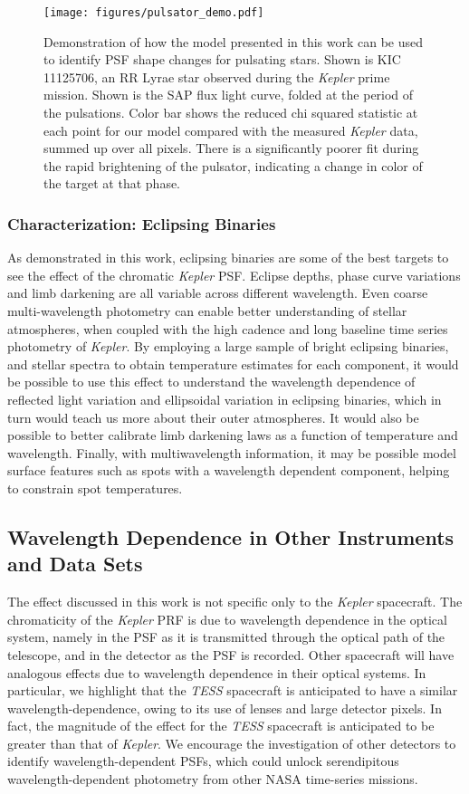 \documentclass[iop]{emulateapj}
\newcommand{\kepler}{\emph{Kepler}\xspace}
\newcommand{\tess}{\emph{TESS}\xspace}
\begin{document}
\begin{figure}
    \centering
    \texttt{[image: figures/pulsator\_demo.pdf]}
    \caption{Demonstration of how the model presented in this work can be used to identify PSF shape changes for pulsating stars. Shown is KIC 11125706, an RR Lyrae star observed during the \kepler prime mission. Shown is the SAP flux light curve, folded at the period of the pulsations. Color bar shows the reduced chi squared statistic at each point for our model compared with the measured \kepler data, summed up over all pixels. There is a significantly poorer fit during the rapid brightening of the pulsator, indicating a change in color of the target at that phase.}
    \label{fig:pulsator_demos}
\end{figure}



\subsubsection{Characterization: Eclipsing Binaries}
As demonstrated in this work, eclipsing binaries are some of the best targets to see the effect of the chromatic \kepler PSF. Eclipse depths, phase curve variations and limb darkening are all variable across different wavelength. Even coarse multi-wavelength photometry can enable better understanding of stellar atmospheres, when coupled with the high cadence and long baseline time series photometry of \kepler. By employing a large sample of bright eclipsing binaries, and stellar spectra to obtain temperature estimates for each component, it would be possible to use this effect to understand the wavelength dependence of reflected light variation and ellipsoidal variation in eclipsing binaries, which in turn would teach us more about their outer atmospheres. It would also be possible to better calibrate limb darkening laws as a function of temperature and wavelength. Finally, with multiwavelength information, it may be possible model surface features such as spots with a wavelength dependent component, helping to constrain spot temperatures.

\subsection{Wavelength Dependence in Other Instruments and Data Sets}
The effect discussed in this work is not specific only to the \kepler spacecraft. The chromaticity of the \kepler PRF is due to wavelength dependence in the optical system, namely in the PSF as it is transmitted through the optical path of the telescope, and in the detector as the PSF is recorded. Other spacecraft will have analogous effects due to wavelength dependence in their optical systems. In particular, we highlight that the \tess spacecraft is anticipated to have a similar wavelength-dependence, owing to its use of lenses and large detector pixels. In fact, the magnitude of the effect for the \tess spacecraft is anticipated to be greater than that of \kepler. We encourage the investigation of other detectors to identify wavelength-dependent PSFs, which could unlock serendipitous wavelength-dependent photometry from other NASA time-series missions.
\end{document}
